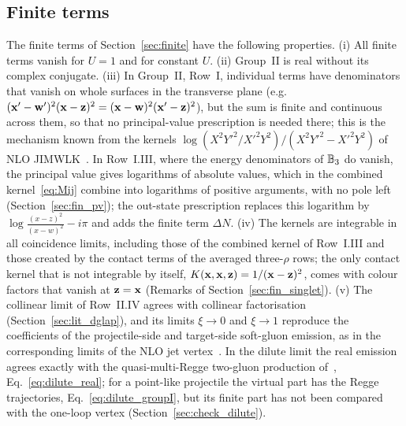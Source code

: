 \subsection{Finite terms}\label{sec:lit_finite}

The finite terms of Section~\ref{sec:finite} have the following properties. (i) All finite terms vanish for $U=1$ and for constant $U$. (ii) Group~II is real without its complex conjugate. (iii) In Group~II, Row~I, individual terms have denominators that vanish on whole surfaces in the transverse plane (e.g.\ $(\mathbf{x}'-\mathbf{w}')^2(\mathbf{x}-\mathbf{z})^2=(\mathbf{x}-\mathbf{w})^2(\mathbf{x}'-\mathbf{z})^2$), but the sum is finite and continuous across them, so that no principal-value prescription is needed there; this is the mechanism known from the kernels $\log(X^2Y'^2/X'^2Y^2)/(X^2Y'^2-X'^2Y^2)$ of NLO JIMWLK~\cite{Balitsky:2013fea,Kovner:2013ona}. In Row~I.III, where the energy denominators of $\mathbb{B}_3$ do vanish, the principal value gives logarithms of absolute values, which in the combined kernel~\eqref{eq:Mij} combine into logarithms of positive arguments, with no pole left (Section~\ref{sec:fin_pv}); the out-state prescription replaces this logarithm by $\log\frac{(x-z)^2}{(x-w)^2}-i\pi$ and adds the finite term $\Delta N$. (iv) The kernels are integrable in all coincidence limits, including those of the combined kernel of Row~I.III and those created by the contact terms of the averaged three-$\rho$ rows; the only contact kernel that is not integrable by itself, $K(\mathbf{x},\mathbf{x},\mathbf{z})=1/(\mathbf{x}-\mathbf{z})^2$, comes with colour factors that vanish at $\mathbf{z}=\mathbf{x}$ (Remarks of Section~\ref{sec:fin_singlet}). (v) The collinear limit of Row~II.IV agrees with collinear factorisation (Section~\ref{sec:lit_dglap}), and its limits $\xi\to0$ and $\xi\to1$ reproduce the coefficients of the projectile-side and target-side soft-gluon emission, as in the corresponding limits of the NLO jet vertex~\cite{Bartels:2006hg}. In the dilute limit the real emission agrees exactly with the quasi-multi-Regge two-gluon production of~\cite{Fadin:1998py,Bartels:2006hg}, Eq.~\eqref{eq:dilute_real}; for a point-like projectile the virtual part has the Regge trajectories, Eq.~\eqref{eq:dilute_groupI}, but its finite part has not been compared with the one-loop vertex (Section~\ref{sec:check_dilute}).

